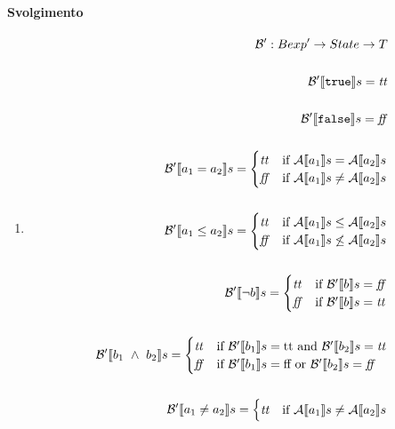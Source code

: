 \paragraph{Svolgimento}  
\begin{enumerate}[label=(\alph*)]
  \item 
\begin{align*}
\mathcal{B'}: Bexp' \rightarrow State \rightarrow T \\ \\
\Bext{\syntrue} = \semtrue \\ \\ 
\Bext{\synfalse} = \semfalse \\ \\
\Bext{a_1 = a_2} = 
  \begin{cases} 
  \semtrue & 
  \mbox{if} \ \A{a_1} = \A{a_2}\\ 
  \semfalse & 
  \mbox{if}  \ \A{a_1} \neq \A{a_2}\\
  \end{cases} \\ \\
\Bext{a_1 \leq a_2} = 
  \begin{cases} 
  \semtrue & 
  \mbox{if} \ \A{a_1} \leq \A{a_2}\\ 
  \semfalse & 
  \mbox{if} \ \A{a_1} \not \leq \A{a_2}\\
  \end{cases} \\ \\
\Bext{\neg b} =         
  \begin{cases} 
  \semtrue & 
  \mbox{if} \ \Bext{b} = \semfalse\\ 
  \semfalse & 
  \mbox{if} \ \Bext{b} = \semtrue\\
  \end{cases} \\ \\
\Bext{b_1 \ \land \ b_2} = 
  \begin{cases} 
  \semtrue & 
  \mbox{if} \ \Bext{b_1} = \mbox{tt and } 
            \Bext{b_2} = \semtrue \\ 
  \semfalse & 
  \mbox{if} \ \Bext{b_1} = \mbox{ff or } 
            \Bext{b_2} = \semfalse \\ 
  \end{cases} \\ \\
\Bext{a_1 \neq a_2} = 
  \begin{cases} 
  \semtrue & 
  \mbox{if} \ \A{a_1} \neq \A{a_2}\\ 

\end{cases}
\end{align*}
\end{enumerate}
